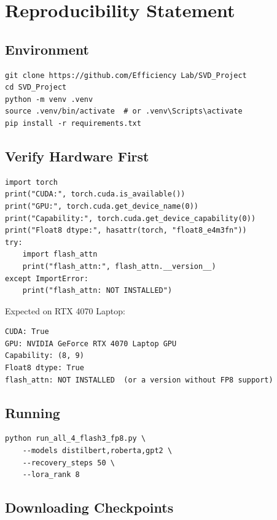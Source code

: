 
\section{Reproducibility Statement}

\subsection{Environment}

\begin{lstlisting}
git clone https://github.com/Efficiency Lab/SVD_Project
cd SVD_Project
python -m venv .venv
source .venv/bin/activate  # or .venv\Scripts\activate
pip install -r requirements.txt
\end{lstlisting}

\subsection{Verify Hardware First}

\begin{lstlisting}
import torch
print("CUDA:", torch.cuda.is_available())
print("GPU:", torch.cuda.get_device_name(0))
print("Capability:", torch.cuda.get_device_capability(0))
print("Float8 dtype:", hasattr(torch, "float8_e4m3fn"))
try:
    import flash_attn
    print("flash_attn:", flash_attn.__version__)
except ImportError:
    print("flash_attn: NOT INSTALLED")
\end{lstlisting}

Expected on RTX 4070 Laptop:

\begin{lstlisting}
CUDA: True
GPU: NVIDIA GeForce RTX 4070 Laptop GPU
Capability: (8, 9)
Float8 dtype: True
flash_attn: NOT INSTALLED  (or a version without FP8 support)
\end{lstlisting}

\subsection{Running}

\begin{lstlisting}
python run_all_4_flash3_fp8.py \
    --models distilbert,roberta,gpt2 \
    --recovery_steps 50 \
    --lora_rank 8
\end{lstlisting}

\subsection{Downloading Checkpoints}

